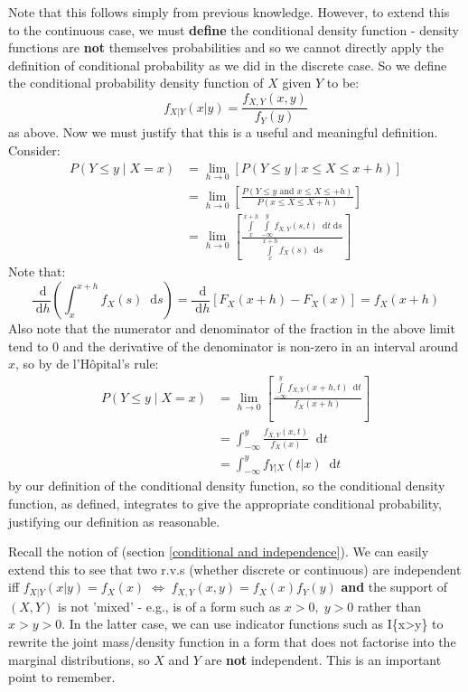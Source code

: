 \documentclass[12pt,a4paper]{article}
\newcommand{\diff}{\;\mathrm{d}}
\newcommand{\uline}[1]{\underline{\smash{#1}}}
\begin{document}
Note that this follows simply from previous knowledge. However, to extend this to the continuous case, we must \textbf{define} the conditional density function - density functions are \textbf{not} themselves probabilities and so we cannot directly apply the definition of conditional probability as we did in the discrete case. So we define the conditional probability density function of $X$ given $Y$ to be:
$$f_{X|Y}(x|y) = \frac{f_{X,Y}(x,y)}{f_Y(y)}$$
as above. Now we must justify that this is a useful and meaningful definition. Consider:
\begin{align*}
P(Y\leq y\; | \; X=x) &= \lim_{h\rightarrow 0} [P(Y\leq y\; | \; x\leq X\leq x+h)]\\
&= \lim_{h\rightarrow 0} \left[\frac{P(Y\leq y \text{ and } x\leq X \leq +h)}{P(x\leq X \leq X+h)}\right]\\
&= \lim_{h\rightarrow 0} \left[\frac{\int\limits_x^{x+h}\!\!\int\limits_{-\infty}^y\!\! f_{X,Y}(s,t)\;\diff t\diff s}{\int\limits_x^{x+h}\!\! f_X(s)\;\diff s}\right]
\end{align*}
Note that:
$$\frac{\diff}{\diff h}\!\left(\int_x^{x+h}\!\!\!\!f_X(s)\;\diff s\right) = \frac{\diff}{\diff h}\!\left[F_X(x+h)-F_X(x)\right] = f_X\!(x+h)$$
Also note that the numerator and denominator of the fraction in the above limit tend to 0 and the derivative of the denominator is non-zero in an interval around $x$, so by de l'H\^opital's rule:
\begin{align*}
P(Y\leq y\; | \; X=x) &= \lim_{h\rightarrow 0}\left[\frac{\int\limits_{-\infty}^y\!\! f_{X,Y}(x+h,t)\;\diff t}{f_X(x+h)}\right]\\
&= \int_{-\infty}^y\!\!\frac{f_{X,Y}(x,t)}{f_X(x)}\;\diff t\\
&= \int_{-\infty}^y\!\! f_{Y|X}(t|x)\;\diff t
\end{align*}
by our definition of the conditional density function, so the conditional density function, as defined, integrates to give the appropriate conditional probability, justifying our definition as reasonable.

Recall the notion of \uline{independence} (section \ref{conditional and independence}). We can easily extend this to see that two r.v.s (whether discrete or continuous) are independent iff $f_{X|Y}(x|y) = f_X(x) \; \Leftrightarrow \; f_{X,Y}(x,y) = f_X(x)f_Y(y)$ \textbf{and} the support of $(X,Y)$ is not 'mixed' - e.g., is of a form such as $x>0,\; y>0$ rather than $x>y>0$. In the latter case, we can use indicator functions such as I\{x>y\} to rewrite the joint mass/density function in a form that does not factorise into the marginal distributions, so $X$ and $Y$ are \textbf{not} independent. This is an important point to remember.
\end{document}
